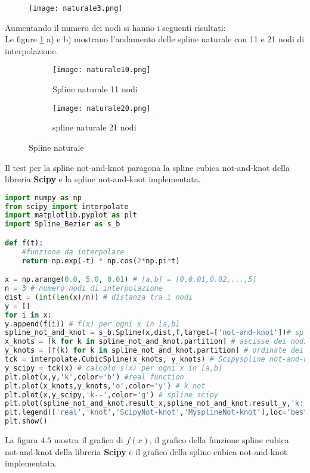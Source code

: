 \documentclass[a4paper,12pt]{report}
\theoremstyle{definition}
\begin{document}
\newpage
\begin{figure}[h!t]
	\centering
	\texttt{[image: naturale3.png]}
	\caption{}
\end{figure}
Aumentando il numero dei nodi si hanno i seguenti risultati:\\
Le figure \ref{fig:4pts} a) e b) mostrano l'andamento delle spline naturale con 11 e 21 nodi di interpolazione.
\begin{figure}[h!t]
	\centering
	\begin{subfigure}{0.6\linewidth}
		\texttt{[image: naturale10.png]} 
		\caption{Spline naturale 11 nodi}
	\end{subfigure}
	\begin{subfigure}{0.6\linewidth}
		\texttt{[image: naturale20.png]}
		\caption{spline naturale 21 nodi}
	\end{subfigure}
	\caption{Spline naturale}
	\label{fig:4pts}
\end{figure}
\newpage
Il test per la spline not-and-knot paragona la spline cubica not-and-knot della libreria \textbf{Scipy} e la spline not-and-knot implementata.
\begin{lstlisting}[language=Python]
import numpy as np
from scipy import interpolate
import matplotlib.pyplot as plt
import Spline_Bezier as s_b

def f(t):
	#funzione da interpolare
	return np.exp(-t) * np.cos(2*np.pi*t)

x = np.arange(0.0, 5.0, 0.01) # [a,b] = [0,0.01,0.02,...,5]
n = 3 # numero nodi di interpolazione
dist = (int(len(x)/n)) # distanza tra i nodi
y = []
for i in x:
y.append(f(i)) # f(x) per ogni x in [a,b]
spline_not_and_knot = s_b.Spline(x,dist,f,target=['not-and-knot'])# spline not-and-knot
x_knots = [k for k in spline_not_and_knot.partition] # ascisse dei nodi di interpolazione
y_knots = [f(k) for k in spline_not_and_knot.partition] # ordinate dei nodi di interpolazione
tck = interpolate.CubicSpline(x_knots, y_knots) # Scipyspline not-and-not s(x)
y_scipy = tck(x) # calcolo s(x) per ogni x in [a,b]
plt.plot(x,y,'k',color='b') #real function
plt.plot(x_knots,y_knots,'o',color='y') # k_not
plt.plot(x,y_scipy,'k--',color='g') # spline scipy
plt.plot(spline_not_and_knot.result_x,spline_not_and_knot.result_y,'k:',color='r') #Myspline
plt.legend(['real','knot','ScipyNot-knot','MysplineNot-knot'],loc='best')
plt.show()
\end{lstlisting}
La figura $4.5$ mostra il grafico di $f(x)$, il grafico della funzione spline cubica not-and-knot della libreria \textbf{Scipy} e il grafico della spline cubica not-and-knot implementata.\\
\end{document}
